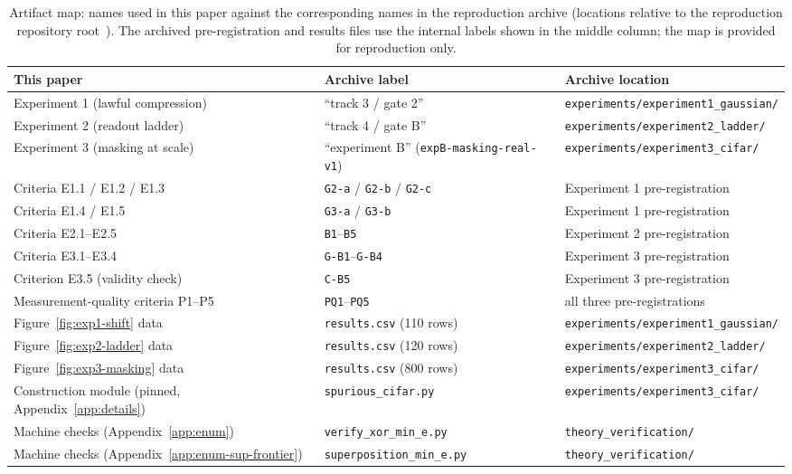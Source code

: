 \documentclass[twocolumn,10pt]{article}
\theoremstyle{definition}
\theoremstyle{remark}
\begin{document}
\begin{table}[H]
\centering
\caption{Artifact map: names used in this paper against the
corresponding names in the reproduction archive (locations relative to the reproduction repository root~\cite{porepro}). The archived pre-registration and results
files use the internal labels shown in the middle column; the map is
provided for reproduction only.}
\label{tab:artifacts}
\footnotesize
\setlength{\tabcolsep}{4.5pt}
\begin{tabular}{lll}
\toprule
This paper & Archive label & Archive location \\
\midrule
Experiment 1 (lawful compression) & ``track 3 / gate 2'' &
\texttt{experiments/experiment1\_gaussian/} \\
Experiment 2 (readout ladder) & ``track 4 / gate B'' &
\texttt{experiments/experiment2\_ladder/} \\
Experiment 3 (masking at scale) & ``experiment B''
(\texttt{expB-masking-real-v1}) & \texttt{experiments/experiment3\_cifar/} \\
Criteria E1.1 / E1.2 / E1.3 & \texttt{G2-a} / \texttt{G2-b} /
\texttt{G2-c} & Experiment 1 pre-registration \\
Criteria E1.4 / E1.5 & \texttt{G3-a} / \texttt{G3-b} &
Experiment 1 pre-registration \\
Criteria E2.1--E2.5 & \texttt{B1}--\texttt{B5} &
Experiment 2 pre-registration \\
Criteria E3.1--E3.4 & \texttt{G-B1}--\texttt{G-B4} &
Experiment 3 pre-registration \\
Criterion E3.5 (validity check) & \texttt{C-B5} &
Experiment 3 pre-registration \\
Measurement-quality criteria P1--P5 & \texttt{PQ1}--\texttt{PQ5} &
all three pre-registrations \\
Figure~\ref{fig:exp1-shift} data & \texttt{results.csv} (110 rows) &
\texttt{experiments/experiment1\_gaussian/} \\
Figure~\ref{fig:exp2-ladder} data & \texttt{results.csv} (120 rows) &
\texttt{experiments/experiment2\_ladder/} \\
Figure~\ref{fig:exp3-masking} data & \texttt{results.csv} (800 rows) &
\texttt{experiments/experiment3\_cifar/} \\
Construction module (pinned, Appendix~\ref{app:details}) &
\texttt{spurious\_cifar.py} & \texttt{experiments/experiment3\_cifar/} \\
Machine checks (Appendix~\ref{app:enum}) & \texttt{verify\_xor\_min\_e.py} &
\texttt{theory\_verification/} \\
Machine checks (Appendix~\ref{app:enum-sup-frontier}) &
\texttt{superposition\_min\_e.py} & \texttt{theory\_verification/} \\
\bottomrule
\end{tabular}
\end{table}
\end{document}
